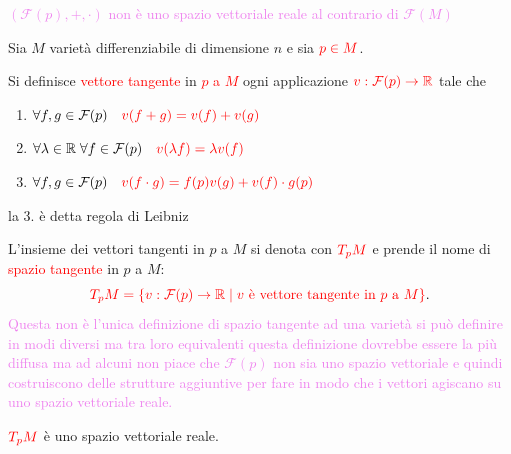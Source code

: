         \textcolor{violet}{$( \mathcal{F}(p), + , \boldsymbol{\cdot} )$ non è uno spazio vettoriale reale al contrario di $\mathcal{F}(M)$}
        \newpage
        \begin{definizione}
        \mbox{}

        Sia $M$ varietà differenziabile di dimensione $n$ e sia $\textcolor{red}{p \in M}$. 
        
        Si definisce \textcolor{red}{vettore tangente} in \textcolor{red}{$p$ a $M$} ogni applicazione $\textcolor{red}{v : \mathcal{F}(p) \to \mathbb{R}}$ tale che
        \begin{enumerate}
        \item $\forall f, g \in \mathcal{F}(p) \quad \textcolor{red}{v(f + g) = v(f) + v(g)}$
        \item $\forall \lambda \in \mathbb{R} \; \forall f \in \mathcal{F}(p) \quad \textcolor{red}{v(\lambda f) = \lambda v(f)}$ 
        \item $\forall f, g \in \mathcal{F}(p) \quad \textcolor{red}{v(f \cdot g) = f(p)v(g) + v(f) \cdot g(p)}$
        \end{enumerate}
        \textcolor{blu}{la } 3. \textcolor{blu}{è detta regola di Leibniz}

        L'insieme dei vettori tangenti in $p$ a $M$ si denota con $\textcolor{red}{T_p M}$ e prende il nome di \textcolor{red}{spazio tangente} in $p$ a $M$:
        \[
        \textcolor{red}{T_p M = \{ v : \mathcal{F}(p) \to \mathbb{R} \mid v \text{ è vettore tangente in } p \text{ a } M \}}.
        \]
        \textcolor{violet}{Questa non è l'unica definizione di spazio tangente ad una varietà si può definire in modi 
        diversi ma tra loro equivalenti questa definizione dovrebbe essere la più diffusa ma ad alcuni non piace che $\mathcal{F}(p)$ 
        non sia uno spazio vettoriale e quindi costruiscono delle strutture aggiuntive per fare in modo che i vettori agiscano su uno spazio vettoriale reale.}
        \end{definizione}
        \begin{proposizione}
        \mbox{}

        $\textcolor{red}{T_p M}$ è uno spazio vettoriale reale.
        \end{proposizione}

